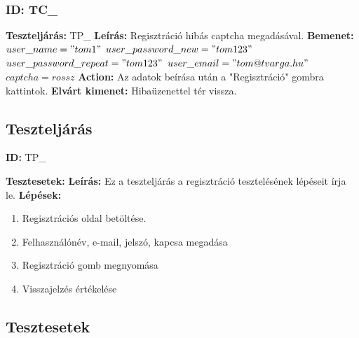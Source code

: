 \documentclass[12pt]{report}
\theoremstyle{definition}
\begin{document}
	\subsubsection{ID: TC\_}\addtocounter{TC}{1}
	\textbf{Teszteljárás:} TP\_
	\newline 
	\textbf{Leírás:} Regisztráció hibás captcha megadásával.
	\newline 
	\textbf{Bemenet:} $user\_name = "tom1"$ $user\_password\_new = "tom123"$ \linebreak$user\_password\_repeat = "tom123"$ $user\_email = "tom@tvarga.hu"$ $captcha = rossz$
	\newline 
	\textbf{Action:} Az adatok beírása után a "Regisztráció" gombra kattintok.
	\newline 
	\textbf{Elvárt kimenet:} Hibaüzenettel tér vissza.
	
	\setcounter{TPTCStop}{\value{TC}}
	\subsection{Teszteljárás}
	\textbf{ID:} TP\_\addtocounter{TP}{1}
	\newline
	\textbf{Tesztesetek:} 
	\newline
	\textbf{Leírás:} Ez a teszteljárás a regisztráció tesztelésének lépéseit írja le.
	\newline
	\textbf{Lépések:}
	\begin{enumerate}
		\item Regisztrációs oldal betöltése.
		\item Felhasználónév, e-mail, jelszó, kapcsa megadása
		\item Regisztráció gomb megnyomása
		\item Visszajelzés értékelése 
	\end{enumerate}
	
	
	
	\subsection{Tesztesetek}
	\setcounter{TPTCStart}{\value{TC}}
	
\end{document}
